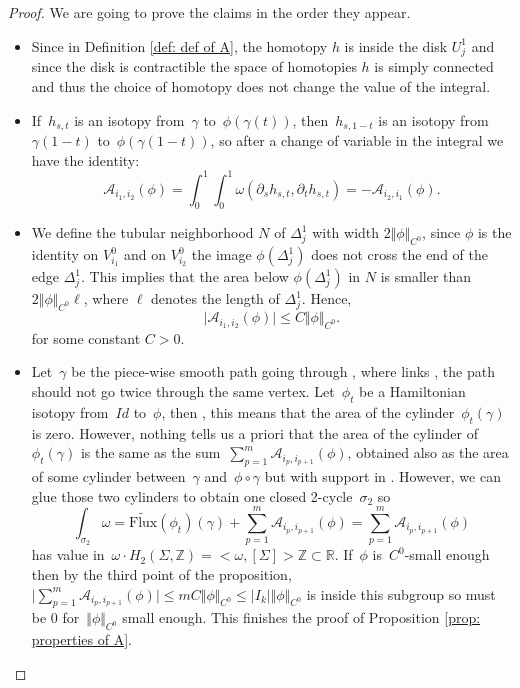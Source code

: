 \documentclass[10pt]{amsart}
\begin{document}
\begin{proof}

We are going to prove the claims in the order they appear.

\begin{itemize}
    \item[(i)] Since in Definition \ref{def: def of A}, the homotopy $h$ is inside the disk $U^1_j$ and since the disk is contractible the space of homotopies $h$ is simply connected and thus the choice of homotopy does not change the value of the integral.
    
    \item[(ii)] If~$h_{s,t}$ is an isotopy from~$\gamma$ to~$\phi(\gamma(t))$, then~$h_{s,1-t}$ is an isotopy from~$\gamma(1-t)$ to~$\phi(\gamma(1-t))$, so after a change of variable in the integral we have the identity:
    $$\mathcal{A}_{i_1,i_2}(\phi)=\int_0^1\int_0^1 \omega(\partial_s h_{s,t},\partial_t h_{s,t})=-\mathcal{A}_{i_2,i_1}(\phi).$$
    
    \item[(iii)] We define the tubular neighborhood $N$ of $\Delta^1_j$ with width $2\Vert \phi \Vert_{C^0}$, since $\phi$ is the identity on $V^0_{i_1}$ and on $V^0_{i_2}$ the image $\phi(\Delta^1_j)$ does not cross the end of the edge $\Delta^1_j$. This implies that the area below $\phi(\Delta^1_j)$ in $N$ is smaller than $2\Vert \phi \Vert_{C^0}\ell$, where $\ell$ denotes the length of $\Delta^1_j$. Hence,
    \[\vert \mathcal{A}_{i_1,i_2}(\phi)\vert\leq C \Vert \phi \Vert_{C^0}.\]
    for some constant $C > 0$.
    
    \item[(iv)] Let~$\gamma$ be the piece-wise smooth path going through , where  links , the path should not go twice through the same vertex. Let~$\phi_t$ be a Hamiltonian isotopy from~$Id$ to~$\phi$, then , this means that the area of the cylinder~$\phi_t(\gamma)$ is zero. However, nothing tells us a priori that the area of the cylinder of~$\phi_t(\gamma)$ is the same as the sum~$\sum_{p=1}^m \mathcal{A}_{i_p,i_{p+1}}(\phi)$, obtained also as the area of some cylinder between~$\gamma$ and~$\phi\circ \gamma$ but with support in . However, we can glue those two cylinders to obtain one closed 2-cycle~$\sigma_2$ so
    $$\int_{\sigma_2}\omega=\widetilde{\text{Flux}}(\phi_t)(\gamma)+\sum_{p=1}^m \mathcal{A}_{i_p,i_{p+1}}(\phi)=\sum_{p=1}^m \mathcal{A}_{i_p,i_{p+1}}(\phi)$$ 
    has value in~$\omega \cdot H_2(\Sigma,\mathbb{Z})= <\omega, [\Sigma]>\mathbb{Z} \subset \mathbb{R}$. If~$\phi$ is~$C^0$-small enough then by the third point of the proposition,~$\vert\sum_{p=1}^m \mathcal{A}_{i_p,i_{p+1}}(\phi)\vert\leq m C \Vert \phi \Vert_{C^0}\leq \vert I_k\vert \Vert \phi \Vert_{C^0}$ is inside this subgroup so must be 0 for~$\Vert \phi \Vert_{C^0}$ small enough. This finishes the proof of Proposition \ref{prop: properties of A}.
\end{itemize}
\end{proof}
\end{document}
